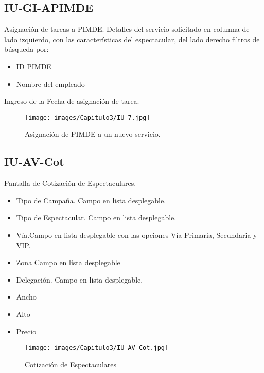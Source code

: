 \subsection{IU-GI-APIMDE}
    Asignación de tareas a PIMDE.
    Detalles del servicio solicitado en columna de lado izquierdo, con las características del espectacular, del lado derecho filtros de búsqueda por:
    \begin{itemize}
        \item ID PIMDE
        \item Nombre del empleado
    \end{itemize}
     Ingreso de la Fecha de asignación de tarea.
\begin{figure}[htbp!]
    \centering
    \texttt{[image: images/Capitulo3/IU-7.jpg]}
    \caption{Asignación de PIMDE a un nuevo  servicio.}
    \label{fig:my_label}
\end{figure}
\clearpage

\subsection{IU-AV-Cot}
    Pantalla de Cotización de Espectaculares.
    \begin{itemize}
    \item Tipo de Campaña. Campo en lista desplegable.
    \item Tipo de Espectacular. Campo en lista desplegable.
    \item Vía.Campo en lista desplegable con las opciones Vía Primaria, Secundaria y VIP. 
    \item Zona Campo en lista desplegable
    \item Delegación. Campo en lista desplegable.
    \item Ancho
    \item Alto
    \item Precio
    \end{itemize}
\begin{figure}[htbp!]
    \centering
    \texttt{[image: images/Capitulo3/IU-AV-Cot.jpg]}
    \caption{Cotización de Espectaculares}
    \label{fig:my_label}
\end{figure}
\clearpage

    
